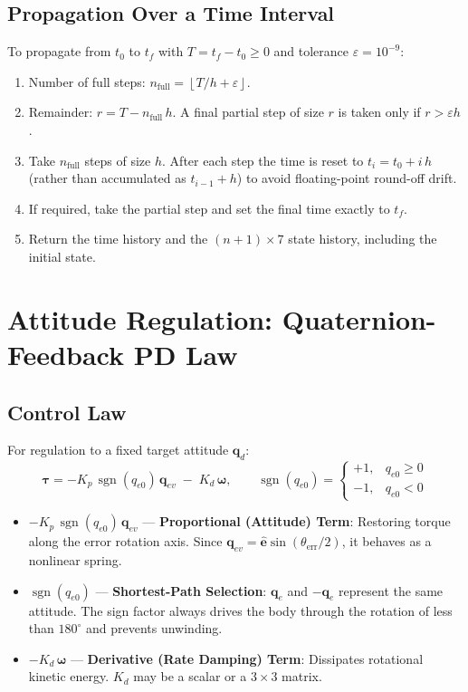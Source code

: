 \documentclass[11pt, a4paper]{article}
\newcommand{\vect}[1]{\boldsymbol{#1}}
\newcommand{\w}{\vect{\omega}}
\newcommand{\sgn}{\operatorname{sgn}}
\begin{document}
\subsection{Propagation Over a Time Interval}
To propagate from $t_0$ to $t_f$ with $T = t_f - t_0 \ge 0$ and tolerance $\varepsilon = 10^{-9}$:
\begin{enumerate}
    \item Number of full steps: $n_{\text{full}} = \left\lfloor T/h + \varepsilon \right\rfloor$.
    \item Remainder: $r = T - n_{\text{full}}\, h$. A final partial step of size $r$ is taken only if $r > \varepsilon h$.
    \item Take $n_{\text{full}}$ steps of size $h$. After each step the time is reset to $t_i = t_0 + i\,h$ (rather than accumulated as $t_{i-1} + h$) to avoid floating-point round-off drift.
    \item If required, take the partial step and set the final time exactly to $t_f$.
    \item Return the time history and the $(n+1) \times 7$ state history, including the initial state.
\end{enumerate}

\section{Attitude Regulation: Quaternion-Feedback PD Law}

\subsection{Control Law}
For regulation to a fixed target attitude $\vect{q}_d$:
\begin{equation}
\vect{\tau} = -K_p\, \sgn(q_{e0})\, \vect{q}_{ev} \;-\; K_d\, \w,
\qquad
\sgn(q_{e0}) = \begin{cases} +1, & q_{e0} \ge 0 \\ -1, & q_{e0} < 0 \end{cases}
\end{equation}

\begin{itemize}
    \item $-K_p\, \sgn(q_{e0})\, \vect{q}_{ev}$ --- \textbf{Proportional (Attitude) Term}: Restoring torque along the error rotation axis. Since $\vect{q}_{ev} = \hat{\vect{e}} \sin(\theta_{\text{err}}/2)$, it behaves as a nonlinear spring.
    \item $\sgn(q_{e0})$ --- \textbf{Shortest-Path Selection}: $\vect{q}_e$ and $-\vect{q}_e$ represent the same attitude. The sign factor always drives the body through the rotation of less than $180^\circ$ and prevents unwinding.
    \item $-K_d\, \w$ --- \textbf{Derivative (Rate Damping) Term}: Dissipates rotational kinetic energy. $K_d$ may be a scalar or a $3 \times 3$ matrix.
\end{itemize}
\end{document}
